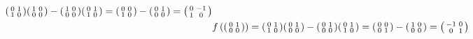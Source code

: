 \begin{solution}
\begin{enumerate}
\begin{alignat*}{1}
            \begin{psmallmatrix}0&1\\1&0\end{psmallmatrix}\begin{psmallmatrix}1&0\\0&0\end{psmallmatrix} - \begin{psmallmatrix}1&0\\0&0\end{psmallmatrix}\begin{psmallmatrix}0&1\\1&0\end{psmallmatrix} = \begin{psmallmatrix}0&0\\1&0\end{psmallmatrix} - \begin{psmallmatrix}0&1\\0&0\end{psmallmatrix} = \begin{psmallmatrix}0&-1\\1&0\end{psmallmatrix} \\
            &f\left(\begin{psmallmatrix}0&1\\0&0\end{psmallmatrix}\right) = 
            \begin{psmallmatrix}0&1\\1&0\end{psmallmatrix}\begin{psmallmatrix}0&1\\0&0\end{psmallmatrix} - \begin{psmallmatrix}0&1\\0&0\end{psmallmatrix}\begin{psmallmatrix}0&1\\1&0\end{psmallmatrix} = \begin{psmallmatrix}0&0\\0&1\end{psmallmatrix} - \begin{psmallmatrix}1&0\\0&0\end{psmallmatrix} = \begin{psmallmatrix}-1&0\\0&1\end{psmallmatrix} \\

\end{alignat*}
\end{enumerate}
\end{solution}
